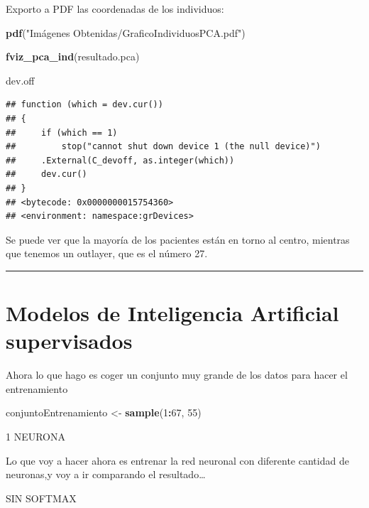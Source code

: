 \documentclass[]{article}
\newenvironment{Shaded}{\begin{snugshade}}{\end{snugshade}}
\newcommand{\KeywordTok}[1]{\textcolor[rgb]{0.13,0.29,0.53}{\textbf{#1}}}
\newcommand{\DecValTok}[1]{\textcolor[rgb]{0.00,0.00,0.81}{#1}}
\newcommand{\StringTok}[1]{\textcolor[rgb]{0.31,0.60,0.02}{#1}}
\newcommand{\OperatorTok}[1]{\textcolor[rgb]{0.81,0.36,0.00}{\textbf{#1}}}
\newcommand{\NormalTok}[1]{#1}
\begin{document}
Exporto a PDF las coordenadas de los individuos:

\begin{Shaded}
\begin{Highlighting}[]
\KeywordTok{pdf}\NormalTok{(}\StringTok{"Imágenes Obtenidas/GraficoIndividuosPCA.pdf"}\NormalTok{)}

\KeywordTok{fviz_pca_ind}\NormalTok{(resultado.pca)}

\NormalTok{dev.off}
\end{Highlighting}
\end{Shaded}

\begin{verbatim}
## function (which = dev.cur()) 
## {
##     if (which == 1) 
##         stop("cannot shut down device 1 (the null device)")
##     .External(C_devoff, as.integer(which))
##     dev.cur()
## }
## <bytecode: 0x0000000015754360>
## <environment: namespace:grDevices>
\end{verbatim}

Se puede ver que la mayoría de los pacientes están en torno al centro,
mientras que tenemos un outlayer, que es el número 27.

\begin{center}\rule{0.5\linewidth}{\linethickness}\end{center}

\section{Modelos de Inteligencia Artificial
supervisados}\label{modelos-de-inteligencia-artificial-supervisados}

Ahora lo que hago es coger un conjunto muy grande de los datos para
hacer el entrenamiento

\begin{Shaded}
\begin{Highlighting}[]
\NormalTok{conjuntoEntrenamiento <-}\StringTok{ }\KeywordTok{sample}\NormalTok{(}\DecValTok{1}\OperatorTok{:}\DecValTok{67}\NormalTok{, }\DecValTok{55}\NormalTok{)}
\end{Highlighting}
\end{Shaded}

1 NEURONA

Lo que voy a hacer ahora es entrenar la red neuronal con diferente
cantidad de neuronas,y voy a ir comparando el resultado\ldots{}

SIN SOFTMAX
\end{document}
